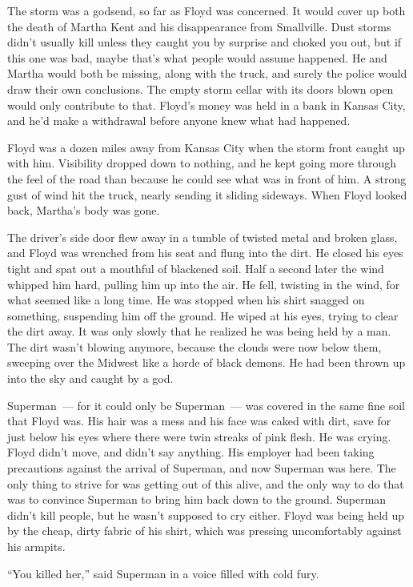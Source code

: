 \documentclass[ebook,12pt]{memoir}
\begin{document}
The storm was a godsend, so far as Floyd was concerned. It would cover
up both the death of Martha Kent and his disappearance from Smallville.
Dust storms didn't usually kill unless they caught you by surprise and
choked you out, but if this one was bad, maybe that's what people would
assume happened. He and Martha would both be missing, along with the
truck, and surely the police would draw their own conclusions. The empty
storm cellar with its doors blown open would only contribute to that.
Floyd's money was held in a bank in Kansas City, and he'd make a
withdrawal before anyone knew what had happened.

Floyd was a dozen miles away from Kansas City when the storm front
caught up with him. Visibility dropped down to nothing, and he kept
going more through the feel of the road than because he could see what
was in front of him. A strong gust of wind hit the truck, nearly sending
it sliding sideways. When Floyd looked back, Martha's body was gone.

The driver's side door flew away in a tumble of twisted metal and broken
glass, and Floyd was wrenched from his seat and flung into the dirt. He
closed his eyes tight and spat out a mouthful of blackened soil. Half a
second later the wind whipped him hard, pulling him up into the air. He
fell, twisting in the wind, for what seemed like a long time. He was
stopped when his shirt snagged on something, suspending him off the
ground. He wiped at his eyes, trying to clear the dirt away. It was only
slowly that he realized he was being held by a man. The dirt wasn't
blowing anymore, because the clouds were now below them, sweeping over
the Midwest like a horde of black demons. He had been thrown up into the
sky and caught by a god.

Superman~--- for it could only be Superman~--- was covered in the same
fine soil that Floyd was. His hair was a mess and his face was caked
with dirt, save for just below his eyes where there were twin streaks of
pink flesh. He was crying. Floyd didn't move, and didn't say anything.
His employer had been taking precautions against the arrival of
Superman, and now Superman was here. The only thing to strive for was
getting out of this alive, and the only way to do that was to convince
Superman to bring him back down to the ground. Superman didn't kill
people, but he wasn't supposed to cry either. Floyd was being held up by
the cheap, dirty fabric of his shirt, which was pressing uncomfortably
against his armpits.

``You killed her,'' said Superman in a voice filled with cold fury.
\end{document}
